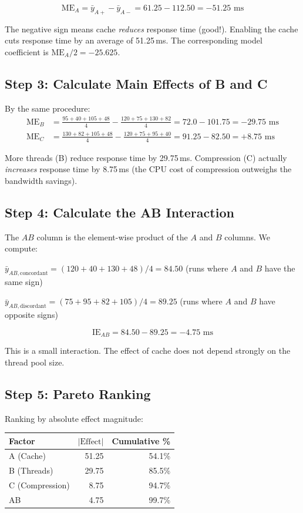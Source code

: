 \documentclass[11pt]{book}
\begin{document}
\[
\text{ME}_A = \bar{y}_{A+} - \bar{y}_{A-} = 61.25 - 112.50 = -51.25 \text{ ms}
\]

The negative sign means cache \emph{reduces} response time (good!). Enabling the
cache cuts response time by an average of 51.25\,ms. The corresponding model
coefficient is $\text{ME}_A / 2 = -25.625$.

\subsection{Step 3: Calculate Main Effects of B and C}

By the same procedure:
\begin{align*}
\text{ME}_B &= \frac{95+40+105+48}{4} - \frac{120+75+130+82}{4} = 72.0 - 101.75 = -29.75 \text{ ms} \\
\text{ME}_C &= \frac{130+82+105+48}{4} - \frac{120+75+95+40}{4} = 91.25 - 82.50 = +8.75 \text{ ms}
\end{align*}

More threads (B) reduce response time by 29.75\,ms. Compression (C) actually
\emph{increases} response time by 8.75\,ms (the CPU cost of compression outweighs
the bandwidth savings).

\subsection{Step 4: Calculate the AB Interaction}

The $AB$ column is the element-wise product of the $A$ and $B$ columns. We compute:

$\bar{y}_{AB,\text{concordant}} = (120 + 40 + 130 + 48)/4 = 84.50$ (runs where $A$
and $B$ have the same sign)

$\bar{y}_{AB,\text{discordant}} = (75 + 95 + 82 + 105)/4 = 89.25$ (runs where $A$
and $B$ have opposite signs)

\[
\text{IE}_{AB} = 84.50 - 89.25 = -4.75 \text{ ms}
\]

This is a small interaction. The effect of cache does not depend strongly on the
thread pool size.

\subsection{Step 5: Pareto Ranking}

Ranking by absolute effect magnitude:

\begin{center}
\begin{tabular}{lrr}
\toprule
Factor & $|\text{Effect}|$ & Cumulative \% \\
\midrule
A (Cache) & 51.25 & 54.1\% \\
B (Threads) & 29.75 & 85.5\% \\
C (Compression) & 8.75 & 94.7\% \\
AB & 4.75 & 99.7\% \\
\bottomrule
\end{tabular}
\end{center}
\end{document}
